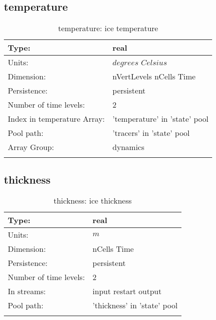 \subsection[temperature]{temperature}
\label{subsec:var_sec_state_temperature}
\begin{center}
\begin{longtable}{| p{2.0in} | p{4.0in} |}
        \hline 
        Type: & real \\
        \hline 
        Units: & $degrees$ $Celsius$ \\
        \hline 
        Dimension: & nVertLevels nCells Time \\
        \hline 
        Persistence: & persistent \\
        \hline 
        Number of time levels: & 2 \\
        \hline 
		 Index in temperature Array: & 'temperature' in 'state' pool \\
		 \hline 
            Pool path: & 'tracers' in 'state' pool
 \\
		 \hline 
		 Array Group: & dynamics \\
		 \hline 
    \caption{temperature: ice temperature}
\end{longtable}
\end{center}
\subsection[thickness]{thickness}
\label{subsec:var_sec_state_thickness}
\begin{center}
\begin{longtable}{| p{2.0in} | p{4.0in} |}
        \hline 
        Type: & real \\
        \hline 
        Units: & $m$ \\
        \hline 
        Dimension: & nCells Time \\
        \hline 
        Persistence: & persistent \\
        \hline 
        Number of time levels: & 2 \\
        \hline 
		 In streams: &  input restart output \\
        \hline 
            Pool path: & 'thickness' in 'state' pool
 \\
		 \hline 
    \caption{thickness: ice thickness}
\end{longtable}
\end{center}
